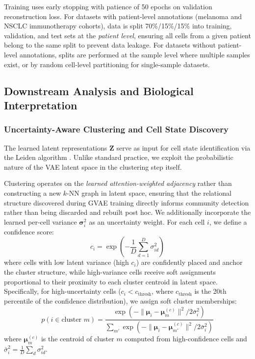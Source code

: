\documentclass{article}
\begin{document}
Training uses early stopping with patience of 50 epochs on validation reconstruction loss. For datasets with patient-level annotations (melanoma and NSCLC immunotherapy cohorts), data is split 70\%/15\%/15\% into training, validation, and test sets at the \textit{patient level}, ensuring all cells from a given patient belong to the same split to prevent data leakage. For datasets without patient-level annotations, splits are performed at the sample level where multiple samples exist, or by random cell-level partitioning for single-sample datasets.


\subsection{Downstream Analysis and Biological Interpretation}

\subsubsection{Uncertainty-Aware Clustering and Cell State Discovery}

The learned latent representations $\mathbf{Z}$ serve as input for cell state identification via the Leiden algorithm \cite{traag2019louvain}. Unlike standard practice, we exploit the probabilistic nature of the VAE latent space in the clustering step itself.

Clustering operates on the \textit{learned attention-weighted adjacency} rather than constructing a new $k$-NN graph in latent space, ensuring that the relational structure discovered during GVAE training directly informs community detection rather than being discarded and rebuilt post hoc. We additionally incorporate the learned per-cell variance $\boldsymbol{\sigma}_i^2$ as an uncertainty weight. For each cell $i$, we define a confidence score:
\begin{equation}
    c_i = \exp\!\left(-\frac{1}{D}\sum_{d=1}^{D} \sigma_{id}^2\right)
    \label{eq:confidence}
\end{equation}
where cells with low latent variance (high $c_i$) are confidently placed and anchor the cluster structure, while high-variance cells receive soft assignments proportional to their proximity to each cluster centroid in latent space. Specifically, for high-uncertainty cells ($c_i < c_{\text{thresh}}$, where $c_{\text{thresh}}$ is the 20th percentile of the confidence distribution), we assign soft cluster memberships:
\begin{equation}
    p(i \in \text{cluster } m) = \frac{\exp(-\|\boldsymbol{\mu}_i - \boldsymbol{\mu}_m^{(c)}\|^2 / 2\bar{\sigma}_i^2)}{\sum_{m'} \exp(-\|\boldsymbol{\mu}_i - \boldsymbol{\mu}_{m'}^{(c)}\|^2 / 2\bar{\sigma}_i^2)}
    \label{eq:soft_assign}
\end{equation}
where $\boldsymbol{\mu}_m^{(c)}$ is the centroid of cluster $m$ computed from high-confidence cells and $\bar{\sigma}_i^2 = \frac{1}{D}\sum_d \sigma_{id}^2$.
\end{document}
